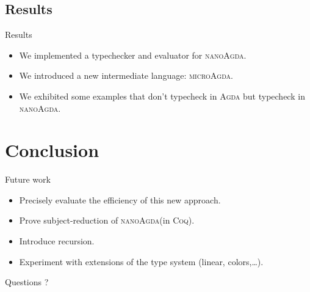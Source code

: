 \documentclass[xcolor=svgnames,11pt]{beamer}
\newcommand{\coq}{\textsc{Coq}\xspace}
\newcommand{\agda}{\textsc{Agda}\xspace}
\newcommand{\ma}{\textsc{microAgda}\xspace}
\newcommand{\na}{\textsc{nanoAgda}\xspace}
\begin{document}
\subsection{Results}
\begin{frame}{Results}
\begin{itemize}
\item We implemented a typechecker and evaluator for \na.
\item We introduced a new intermediate language: \ma.
\item We exhibited some examples that don't typecheck in \agda but typecheck in \na.
\end{itemize}
\end{frame}

\section{Conclusion}
\begin{frame}{Future work}
\begin{itemize}
\item Precisely evaluate the efficiency of this new approach.
\item Prove subject-reduction of \na (in \coq).
\item Introduce recursion.
\item Experiment with extensions of the type system (linear, colors,\dots).
\end{itemize}
\end{frame}

\begin{frame}[plain]
  \begin{center}
    \Huge Questions ?
  \end{center}
\end{frame}
\end{document}

